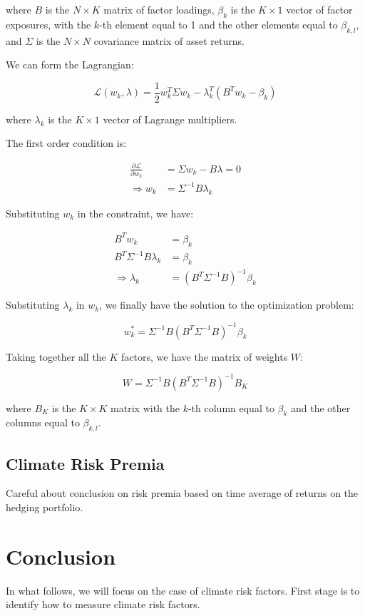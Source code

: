 where $B$ is the $N \times K$ matrix of factor loadings, $\beta_k$ is the $K \times 1$ vector of factor exposures,
with the $k$-th element equal to 1 and the other elements equal to $\beta_{k,l}$, 
and $\Sigma$ is the $N \times N$ covariance matrix of asset returns.

We can form the Lagrangian:

\begin{equation}
    \mathcal{L}(w_k, \lambda) = \frac{1}{2} w_k^T \Sigma w_k - \lambda_k^T (B^T w_k - \beta_k)
\end{equation}

where $\lambda_k$ is the $K \times 1$ vector of Lagrange multipliers.

The first order condition is:

\begin{equation}
    \begin{aligned}
        \frac{\partial \mathcal{L}}{\partial w_k} &= \Sigma w_k - B \lambda = 0 \\
        \Rightarrow w_k &= \Sigma^{-1} B \lambda_k
    \end{aligned}
\end{equation}

Substituting $w_k$ in the constraint, we have:

\begin{equation}
    \begin{aligned}
        B^T w_k &= \beta_k \\
        B^T \Sigma^{-1} B \lambda_k &= \beta_k \\
        \Rightarrow \lambda_k &= (B^T \Sigma^{-1} B)^{-1} \beta_k
    \end{aligned}
\end{equation}

Substituting $\lambda_k$ in $w_k$, we finally have 
the solution to the optimization problem:

\begin{equation}
    w_k^* = \Sigma^{-1} B (B^T \Sigma^{-1} B)^{-1} \beta_k
\end{equation}

Taking together all the $K$ factors, we have the matrix of weights $W$:

\begin{equation}
    W = \Sigma^{-1} B (B^T \Sigma^{-1} B)^{-1} B_K
\end{equation}

where $B_K$ is the $K \times K$ matrix with the $k$-th column equal to $\beta_k$ and the other columns equal to $\beta_{k,l}$.

\subsection{Climate Risk Premia}

Careful about conclusion on risk premia based 
on time average of returns on the hedging portfolio.

\section{Conclusion}

In what follows, we will focus 
on the case of climate risk factors.
First stage is to identify how to measure 
climate risk factors.
